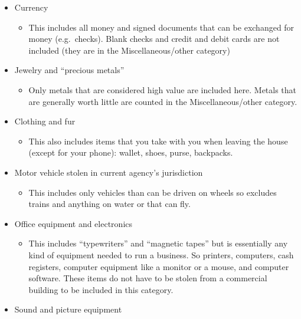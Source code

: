 \documentclass[
]{krantz}
\providecommand{\tightlist}{%
  \setlength{\itemsep}{0pt}\setlength{\parskip}{0pt}}
\begin{document}
\begin{itemize}
\tightlist
\item
  Currency

  \begin{itemize}
  \tightlist
  \item
    This includes all money and signed documents that can be
    exchanged for money (e.g.~checks). Blank checks and
    credit and debit cards are not included (they are in the
    Miscellaneous/other category)
  \end{itemize}
\item
  Jewelry and ``precious metals''

  \begin{itemize}
  \tightlist
  \item
    Only metals that are considered high value are included
    here. Metals that are generally worth little are counted
    in the Miscellaneous/other category.
  \end{itemize}
\item
  Clothing and fur

  \begin{itemize}
  \tightlist
  \item
    This also includes items that you take with you when
    leaving the house (except for your phone): wallet,
    shoes, purse, backpacks.
  \end{itemize}
\item
  Motor vehicle stolen in current agency's jurisdiction

  \begin{itemize}
  \tightlist
  \item
    This includes only vehicles than can be driven on wheels
    so excludes trains and anything on water or that can
    fly.
  \end{itemize}
\item
  Office equipment and electronics

  \begin{itemize}
  \tightlist
  \item
    This includes ``typewriters'' and ``magnetic tapes'' but
    is essentially any kind of equipment needed to run a
    business. So printers, computers, cash registers,
    computer equipment like a monitor or a mouse, and
    computer software. These items do not have to be stolen
    from a commercial building to be included in this
    category.
  \end{itemize}
\item
  Sound and picture equipment


\end{itemize}
\end{document}
